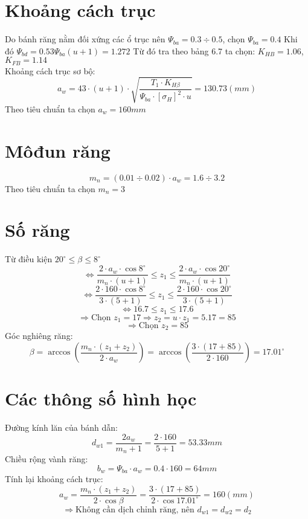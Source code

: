 \section{Khoảng cách trục}
Do bánh răng nằm đối xứng các ổ trục nên $\Psi_{ba} = 0.3 \div 0.5$, chọn $\Psi_{ba} = 0.4$  
Khi đó $\Psi_{bd} = 0.53\Psi_{ba}(u+1) = 1.272$  
Từ đó tra theo bảng 6.7 \cite{reference} ta chọn: $K_{HB} = 1.06$, $K_{FB} = 1.14$  \\
Khoảng cách trục sơ bộ:
\begin{equation}
a_w = 43 \cdot (u+1) \cdot \sqrt{\frac{T_1 \cdot K_{H\beta}}{\Psi_{ba} \cdot [\sigma_H]^2 \cdot u}} = 130.73(mm)
\end{equation}
Theo tiêu chuẩn ta chọn $a_w = 160mm$

\section{Môđun răng}
\begin{equation}
    m_n = (0.01 \div 0.02) \cdot a_w = 1.6 \div 3.2
\end{equation}
Theo tiêu chuẩn ta chọn $m_n = 3$
\section{Số răng}
Từ điều kiện $20^\circ \leq \beta \leq 8^\circ$
\[
\Leftrightarrow \frac{2 \cdot a_w \cdot \cos 8^\circ}{m_n \cdot (u+1)} \leq z_1 \leq \frac{2 \cdot a_w \cdot \cos 20^\circ}{m_n \cdot (u+1)}
\]
\[
\Leftrightarrow \frac{2 \cdot 160 \cdot \cos 8^\circ}{3 \cdot (5+1)} \leq z_1 \leq \frac{2 \cdot 160 \cdot \cos 20^\circ}{3 \cdot (5+1)}
\]
\[
\Leftrightarrow 16.7 \leq z_1 \leq 17.6
\]
\[
\Rightarrow \text{Chọn } z_1 = 17 \Rightarrow z_2 = u \cdot z_1 = 5.17 = 85
\]
\[
\Rightarrow \text{Chọn } z_2 = 85
\]
Góc nghiêng răng:
\begin{equation}
\beta = \arccos \left( \frac{m_n \cdot (z_1 + z_2)}{2 \cdot a_w} \right) = \arccos \left( \frac{3 \cdot (17+85)}{2 \cdot 160} \right) = 17.01^\circ
\end{equation}

\section{Các thông số hình học}

Đường kính lăn của bánh dẫn:
\begin{equation}
d_{w1} = \frac{2a_w}{m_n + 1} = \frac{2 \cdot 160}{5 + 1} = 53.33 mm
\end{equation}
Chiều rộng vành răng:
\begin{equation}
b_w = \Psi_{ba} \cdot a_w = 0.4 \cdot 160 = 64mm
\end{equation}
Tính lại khoảng cách trục:
\begin{equation}
a_w = \frac{m_n \cdot (z_1 + z_2)}{2 \cdot \cos \beta} = \frac{3 \cdot (17 + 85)}{2 \cdot \cos 17.01^\circ} = 160(mm)
\end{equation}
\[
\Rightarrow \text{Không cần dịch chỉnh răng, nên } d_{w1} = d_{w2} = d_2
\]
